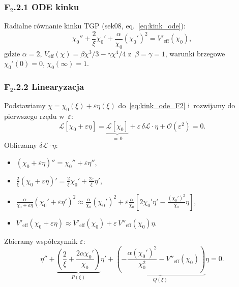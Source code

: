 \subsubsection*{F$_2$.2.1 ODE kinku}

Radialne równanie kinku TGP (sek08, eq.~\eqref{eq:kink_ode}):
\begin{equation}
  \chi_0'' + \frac{2}{\xi}\chi_0'
  + \frac{\alpha}{\chi_0}(\chi_0')^2
  = V'_\mathrm{eff}(\chi_0),
  \label{eq:kink_ode_F2}
\end{equation}
gdzie $\alpha = 2$, $V_\mathrm{eff}(\chi) = \beta\chi^3/3 - \gamma\chi^4/4$
z~$\beta = \gamma = 1$, warunki brzegowe $\chi_0'(0) = 0$,
$\chi_0(\infty) = 1$.

\subsubsection*{F$_2$.2.2 Linearyzacja}

Podstawiamy $\chi = \chi_0(\xi) + \varepsilon\eta(\xi)$
do~\eqref{eq:kink_ode_F2} i~rozwijamy do pierwszego rzędu
w~$\varepsilon$:
\begin{equation}
  \mathcal{L}[\chi_0 + \varepsilon\eta]
  = \underbrace{\mathcal{L}[\chi_0]}_{=\,0}
  + \varepsilon\,\delta\mathcal{L}\cdot\eta
  + \mathcal{O}(\varepsilon^2) = 0.
\end{equation}
Obliczamy $\delta\mathcal{L}\cdot\eta$:
\begin{itemize}
  \item $(\chi_0 + \varepsilon\eta)'' = \chi_0'' + \varepsilon\eta''$,
  \item $\frac{2}{\xi}(\chi_0 + \varepsilon\eta)' = \frac{2}{\xi}\chi_0'
    + \frac{2\varepsilon}{\xi}\eta'$,
  \item $\frac{\alpha}{\chi_0+\varepsilon\eta}(\chi_0'+\varepsilon\eta')^2
    \approx \frac{\alpha}{\chi_0}(\chi_0')^2
    + \varepsilon\frac{\alpha}{\chi_0}\!\left[2\chi_0'\eta'
    - \frac{(\chi_0')^2}{\chi_0}\eta\right]$,
  \item $V'_\mathrm{eff}(\chi_0+\varepsilon\eta)
    \approx V'_\mathrm{eff}(\chi_0) + \varepsilon\,V''_\mathrm{eff}(\chi_0)\eta$.
\end{itemize}
Zbieramy współczynnik $\varepsilon$:
\begin{equation}
  \eta'' + \underbrace{\left(\frac{2}{\xi}
  + \frac{2\alpha\chi_0'}{\chi_0}\right)}_{P(\xi)}\eta'
  + \underbrace{\left(-\frac{\alpha(\chi_0')^2}{\chi_0^2}
  - V''_\mathrm{eff}(\chi_0)\right)}_{Q(\xi)}\eta = 0.
  \label{eq:fluct_ode}
\end{equation}

